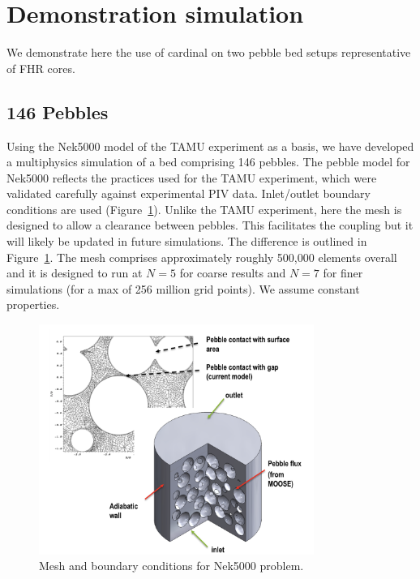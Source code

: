 \section{Demonstration simulation}
\label{s:demo}

We demonstrate here the use of cardinal on two pebble bed setups representative of FHR cores.

\subsection{146 Pebbles}
\label{ss:c4}

Using the Nek5000 model of the TAMU experiment as a basis, we have developed a multiphysics simulation of a bed comprising 146 pebbles.
The pebble model for Nek5000 reflects the practices used for the TAMU experiment, which were validated carefully against experimental PIV data. Inlet/outlet boundary conditions are used (Figure~\ref{f:pb2}). Unlike the TAMU experiment, here the mesh is designed to allow a clearance between pebbles. This facilitates the coupling but it will likely be updated in future simulations. The difference is outlined in Figure~\ref{f:pb2}. The mesh comprises approximately roughly 500,000 elements overall and it is designed to run at $N=5$ for coarse results and $N=7$ for finer simulations (for a max of 256 million grid points). We assume constant properties.

\begin{figure}[!h]
\centering
\includegraphics[clip=true,width=0.8\textwidth]{Figures/pb_mesh}
\caption{Mesh and boundary conditions for Nek5000 problem.}
\label{f:pb2}
\end{figure}

